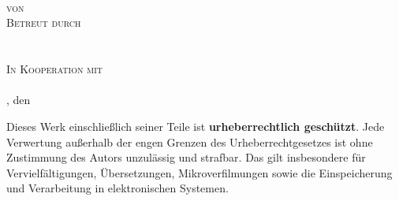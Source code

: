 \begin{titlepage}
	\thispagestyle{empty}
	\begin{center}
		{\scshape\LARGE \VarUniversitaetsname}\\
		\vspace{1.5cm}
		{\huge\VarTitel}\\
		\vspace{1.5cm}
		{\scshape\LARGE \VarArbeit}\\
		\vspace{0.2cm}
		\textsc{von \VarAuthor}\\
		\vspace{1.5cm}
		\textsc{Betreut durch}\\
		\vspace{0.1cm}
		\textsc{\VarErstgutachter}\\
		\textsc{\VarZweitgutachter}\\
		\vspace{0.6cm}
		\textsc{In Kooperation mit}\\
		\vspace{0.1cm}
		\textsc{\VarFirma}\\
		\vspace{0.6cm}
		\VarOrt, den \VarDatum
	\end{center}
	\vfill
	\singlespacing
	\small
	Dieses Werk einschließlich seiner Teile ist \textbf{urheberrechtlich geschützt}. Jede Verwertung außerhalb der engen Grenzen des Urheberrechtgesetzes ist ohne Zustimmung 		des Autors unzulässig und strafbar. Das gilt insbesondere für Vervielfältigungen, Übersetzungen, Mikroverfilmungen sowie die Einspeicherung und Verarbeitung in 				elektronischen Systemen.
\end{titlepage}